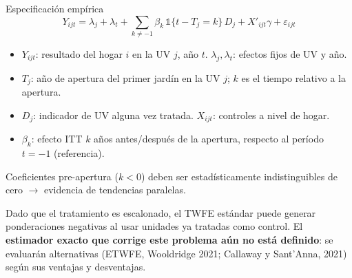 \documentclass[aspectratio=169,10pt]{beamer}
\begin{document}
\begin{frame}{Especificación empírica}
\[
Y_{ijt} = \lambda_j + \lambda_t + \sum_{k \neq -1} \beta_k \, \mathbb{1}\{t - T_j = k\} \, D_j + X'_{ijt}\gamma + \varepsilon_{ijt}
\]

\vspace{2pt}
\begingroup
{}
\begin{itemize}
  \footnotesize
  \item $Y_{ijt}$: resultado del hogar $i$ en la UV $j$, año $t$. \quad $\lambda_j,\lambda_t$: efectos fijos de UV y año.
  \item $T_j$: año de apertura del primer jardín en la UV $j$; $k$ es el tiempo relativo a la apertura.
  \item $D_j$: indicador de UV alguna vez tratada. \quad $X_{ijt}$: controles a nivel de hogar.
  \item $\beta_k$: efecto ITT $k$ años antes/después de la apertura, respecto al período $t=-1$ (referencia).
\end{itemize}
\endgroup

\vspace{2pt}
\begin{block}{Coeficientes pre-apertura ($k<0$)}
\footnotesize deben ser estadísticamente indistinguibles de cero $\to$ evidencia de tendencias paralelas.
\end{block}

\vspace{1pt}
\footnotesize Dado que el tratamiento es escalonado, el TWFE estándar puede generar ponderaciones negativas al usar unidades ya tratadas como control. El \textbf{estimador exacto que corrige este problema aún no está definido}: se evaluarán alternativas (ETWFE, Wooldridge 2021; Callaway y Sant'Anna, 2021) según sus ventajas y desventajas.
\end{frame}
\end{document}

